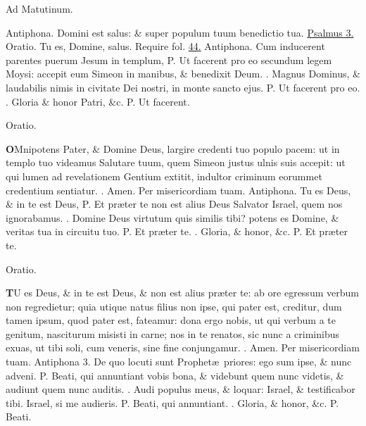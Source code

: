 \documentclass[letter,11pt]{book}
\makeatletter
\DeclareRobustCommand{\Vbar}{\vers@resp{-0.1em}{V}}
\DeclareRobustCommand{\Rbar}{\vers@resp{0pt}{R}}
\newcommand{\vers@resp@sym}{\raisebox{0.2ex}{\rotatebox[origin=c]{-20}{$\m@th\rceil$}}}
\newcommand{\vers@resp}[2]{%
  {\ooalign{\hidewidth\kern#1\vers@resp@sym\hidewidth\cr#2\cr}}%
}%
\def\P{\color{Red} P. \color{black}}
\def\V{\color{Red} \Vbar . \color{black}}
\def\R{\color{Red} \Rbar . \color{black}}
\makeatother
\begin{document}
\begin{multicols*}{2}
\begin{center}
Ad Matutinum.
\end{center}
\vspace{-.75em}
\par \noindent \color{Red} Antiphona. \color{black} Domini est salus: \& super populum tuum benedictio tua. \color{Red} \hyperlink{ps3}{Psalmus 3.} \color{black}
\newline \color{Red} Oratio. \color{black} Tu es, Domine, salus. \color{Red} Require fol. \color{black} \hyperlink{page.44}{44.}%
\newline \color{Red} Antiphona. \color{black} Cum inducerent parentes puerum Jesum in templum, \P Ut facerent pro eo secundum legem Moysi: accepit eum Simeon in manibus, \& benedixit Deum. \V Magnus Dominus, \& laudabilis nimis in civitate Dei nostri, in monte sancto ejus. \P Ut facerent pro eo. \V Gloria \& honor Patri, \&c. \P Ut facerent.
\vspace{-.5em} \begin{center} \color{Red} Oratio. \color{black} \end{center} \vspace{-.5em}
\lettrine[lines=2]{\bfseries \color{Red} O}{}Mnipotens Pater, \& Domine Deus, largire credenti tuo populo pacem: ut in templo tuo videamus Salutare tuum, quem Simeon justus ulnis suis accepit: ut qui lumen ad revelationem Gentium extitit, indultor criminum eorummet credentium sentiatur. \R Amen. Per misericordiam tuam.
\newline \color{Red} Antiphona. \color{black} Tu es Deus, \& in te est Deus, \P Et pr\ae ter te non est alius Deus Salvator Israel, quem nos ignorabamus. \V Domine Deus virtutum quis similis tibi? potens es Domine, \& veritas tua in circuitu tuo. \P Et
pr\ae ter te. \V Gloria, \& honor, \&c. \P Et pr\ae ter te.
\vspace{-.5em} \begin{center} \color{Red} Oratio. \color{black} \end{center} \vspace{-.5em}
\lettrine[lines=2]{\bfseries \color{Red} T}{}U es Deus, \& in te est Deus, \& non est alius pr\ae ter te: ab ore egressum verbum non regredietur; quia utique natus filius non ipse, qui pater est, creditur, dum tamen ipsum, quod pater est, fateamur: dona ergo nobis, ut qui verbum a te genitum, nasciturum misisti in carne; nos in te renatos, sic nunc a criminibus exuas, ut tibi soli, cum veneris, sine fine conjungamur. \R Amen. Per misericordiam tuam.
\newline \color{Red} Antiphona 3. \color{black} De quo locuti sunt Prophet\ae \ priores: ego sum ipse, \& nunc adveni. \P Beati, qui annuntiant vobis bona, \& videbunt quem nunc videtis, \& audiunt quem nunc auditis. \V Audi populus meus, \& loquar: Israel, \& testificabor tibi. Israel, si me audieris. \P Beati, qui annuntiant. \V Gloria, \& honor, \&c. \P Beati.

\end{multicols*}
\end{document}
